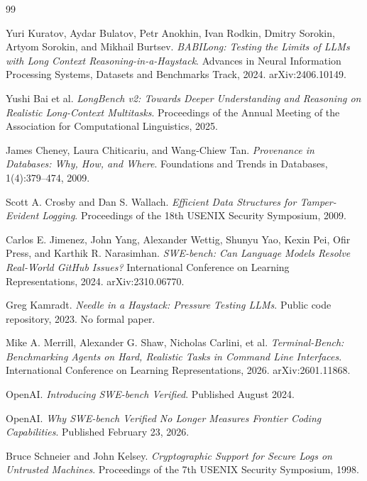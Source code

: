 \documentclass[11pt]{article}
\begin{document}
\begin{thebibliography}{99}

Yuri Kuratov, Aydar Bulatov, Petr Anokhin, Ivan Rodkin, Dmitry Sorokin, Artyom Sorokin, and Mikhail Burtsev.
\newblock \emph{BABILong: Testing the Limits of LLMs with Long Context Reasoning-in-a-Haystack}.
\newblock Advances in Neural Information Processing Systems, Datasets and Benchmarks Track, 2024. arXiv:2406.10149.

Yushi Bai et al.
\newblock \emph{LongBench v2: Towards Deeper Understanding and Reasoning on Realistic Long-Context Multitasks}.
\newblock Proceedings of the Annual Meeting of the Association for Computational Linguistics, 2025.

James Cheney, Laura Chiticariu, and Wang-Chiew Tan.
\newblock \emph{Provenance in Databases: Why, How, and Where}.
\newblock Foundations and Trends in Databases, 1(4):379--474, 2009.

Scott A. Crosby and Dan S. Wallach.
\newblock \emph{Efficient Data Structures for Tamper-Evident Logging}.
\newblock Proceedings of the 18th USENIX Security Symposium, 2009.

Carlos E. Jimenez, John Yang, Alexander Wettig, Shunyu Yao, Kexin Pei, Ofir Press, and Karthik R. Narasimhan.
\newblock \emph{SWE-bench: Can Language Models Resolve Real-World GitHub Issues?}
\newblock International Conference on Learning Representations, 2024. arXiv:2310.06770.

Greg Kamradt.
\newblock \emph{Needle in a Haystack: Pressure Testing LLMs}.
\newblock Public code repository, 2023. No formal paper.

Mike A. Merrill, Alexander G. Shaw, Nicholas Carlini, et al.
\newblock \emph{Terminal-Bench: Benchmarking Agents on Hard, Realistic Tasks in Command Line Interfaces}.
\newblock International Conference on Learning Representations, 2026. arXiv:2601.11868.

OpenAI.
\newblock \emph{Introducing SWE-bench Verified}.
\newblock Published August 2024.

OpenAI.
\newblock \emph{Why SWE-bench Verified No Longer Measures Frontier Coding Capabilities}.
\newblock Published February 23, 2026.

Bruce Schneier and John Kelsey.
\newblock \emph{Cryptographic Support for Secure Logs on Untrusted Machines}.
\newblock Proceedings of the 7th USENIX Security Symposium, 1998.


\end{thebibliography}
\end{document}
